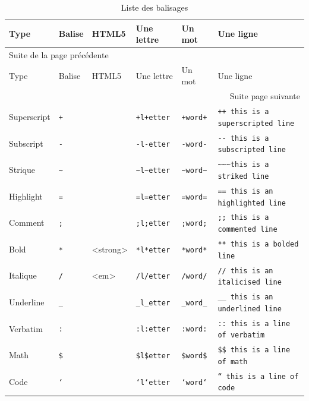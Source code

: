 \documentclass[a4paper,12pt]{article}
\begin{document}
\begin{longtable}{llllll}
\caption{\label{tab:org5687a90}Liste des balisages}
\\
\hline
Type & Balise & HTML5 & Une lettre & Un mot & Une ligne\\
\hline
\endfirsthead
\multicolumn{6}{l}{Suite de la page précédente} \\
\hline

Type & Balise & HTML5 & Une lettre & Un mot & Une ligne \\

\hline
\endhead
\hline\multicolumn{6}{r}{Suite page suivante} \\
\endfoot
\endlastfoot
\hline
Superscript & \texttt{+} &  & \texttt{+l+etter} & \texttt{+word+} & \texttt{++ this is a superscripted line}\\
Subscript & \texttt{-} &  & \texttt{-l-etter} & \texttt{-word-} & \texttt{-{}-{} this is a subscripted line}\\
Strique & \texttt{\textasciitilde{}} &  & \texttt{\textasciitilde{}l\textasciitilde{}etter} & \texttt{\textasciitilde{}word\textasciitilde{}} & \texttt{\textasciitilde{}\textasciitilde{}\textasciitilde{}this is a striked line}\\
Highlight & \texttt{=} &  & \texttt{=l=etter} & \texttt{=word=} & \texttt{== this is an highlighted line}\\
Comment & \texttt{;} &  & \texttt{;l;etter} & \texttt{;word;} & \texttt{;; this is a commented line}\\
Bold & \texttt{*} & <strong> & \texttt{*l*etter} & \texttt{*word*} & \texttt{** this is a bolded line}\\
Italique & \texttt{/} & <em> & \texttt{/l/etter} & \texttt{/word/} & \texttt{// this is an italicised line}\\
Underline & \texttt{\_} &  & \texttt{\_l\_etter} & \texttt{\_word\_} & \texttt{\_\_ this is an underlined line}\\
Verbatim & \texttt{:} &  & \texttt{:l:etter} & \texttt{:word:} & \texttt{:: this is a line of verbatim}\\
Math & \texttt{\$} &  & \texttt{\$l\$etter} & \texttt{\$word\$} & \texttt{\$\$ this is a line of math}\\
Code & \texttt{`} &  & \texttt{`l`etter} & \texttt{`word`} & \texttt{`` this is a line of code}\\
\hline
\end{longtable}
\end{document}
